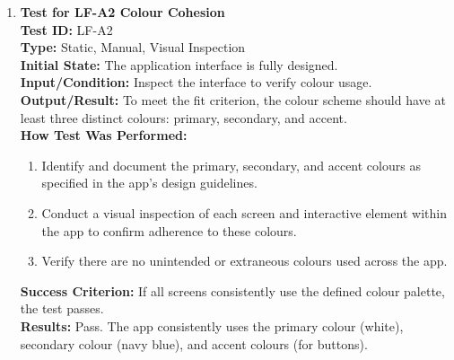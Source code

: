 \documentclass[12pt, titlepage]{article}
\begin{document}
\begin{enumerate}
    \item \textbf{Test for LF-A2 Colour Cohesion} \\
      \newline
      \textbf{Test ID:} LF-A2 \\
      \textbf{Type:} Static, Manual, Visual Inspection \\
      \textbf{Initial State:} The application interface is fully designed. \\
      \textbf{Input/Condition:} Inspect the interface to verify colour usage. \\
      \textbf{Output/Result:} To meet the fit criterion, the colour scheme should have at least three distinct colours: primary, 
      secondary, and accent. \\
      \textbf{How Test Was Performed:}
      \begin{enumerate}
          \item Identify and document the primary, secondary, and accent colours as specified in the app's design guidelines.
          \item Conduct a visual inspection of each screen and interactive element within the app to confirm adherence to these colours.
          \item Verify there are no unintended or extraneous colours used across the app.
      \end{enumerate}
      \textbf{Success Criterion:} If all screens consistently use the defined colour palette, the test passes.\\
      \textbf{Results:} Pass. The app consistently uses the primary colour (white), secondary colour (navy blue), and accent colours (for buttons).\\


\end{enumerate}
\end{document}
